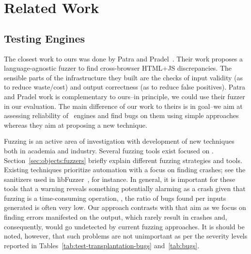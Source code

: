 \documentclass[10pt,conference,anonymous]{IEEEtran}
\begin{document}


\section{Related Work}

\subsection{Testing \js{} Engines}
\label{sec:testing-js-engines}
The closest work to ours was done by Patra and
Pradel~\cite{patra2016learning}. Their work proposes a
language-agnostic fuzzer to find cross-browser HTML+JS
discrepancies. The sensible parts of the infrastructure they
built are the checks of input validity (as to reduce waste/cost) and
output correctness (as to reduce false positives). Patra and Pradel
work is complementary to ours--in principle, we could use their fuzzer
in our evaluation. The main difference of our work to theirs is in
goal--we aim at assessing reliability of \js\ engines and find bugs on
them using simple approaches whereas they aim at proposing a new
technique.

Fuzzing is an active area of investigation with development of new
techniques both in academia and industry. Several fuzzing tools exist
focused on \js. Section~\ref{sec:objects:fuzzers} briefly explain
different fuzzing strategies and tools. Existing techniques prioritize
automation with a focus on finding crashes; see the sanitizers used in
libFuzzer~\cite{libfuzzer-tutorial}, for instance. In general, it is
important for these tools that a warning reveals something potentially
alarming as a crash given that fuzzing is a time-consuming operation,
\ie{}, the ratio of bugs found per inputs generated is often very low.
Our approach contrasts with that aim as we focus on finding errors
manifested on the output, which rarely result in crashes and,
consequently, would go undetected by current fuzzing approaches. It is
should be noted, however, that such problems are not unimportant as
per the severity levels reported in
Tables~\ref{tab:test-transplantation-bugs} and~\ref{tab:bugs}.
\end{document}
